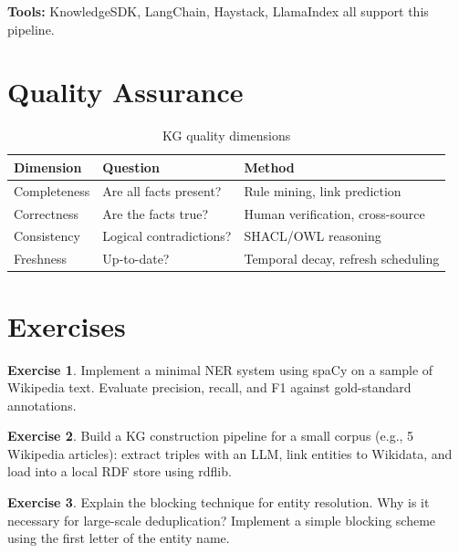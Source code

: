 \documentclass[11pt,a4paper,oneside,openany]{book}
\theoremstyle{definition}
\newtheorem{exercise}{Exercise}[chapter]
\theoremstyle{plain}
\theoremstyle{remark}
\begin{document}
\textbf{Tools:} KnowledgeSDK, LangChain, Haystack, LlamaIndex all support this pipeline.

\section{Quality Assurance}\label{sec:qa}

\begin{table}[h]
	\centering
	\caption{KG quality dimensions}
	\label{tab:kg-quality}
	\begin{tabular}{lp{4cm}p{5.5cm}}
		\toprule
		Dimension    & Question                & Method                             \\
		\midrule
		Completeness & Are all facts present?  & Rule mining, link prediction       \\
		Correctness  & Are the facts true?     & Human verification, cross-source   \\
		Consistency  & Logical contradictions? & SHACL/OWL reasoning                \\
		Freshness    & Up-to-date?             & Temporal decay, refresh scheduling \\
		\bottomrule
	\end{tabular}
\end{table}

\section{Exercises}

\begin{exercise}
	Implement a minimal NER system using spaCy on a sample of Wikipedia text. Evaluate precision, recall, and F1 against gold-standard annotations.
\end{exercise}

\begin{exercise}
	Build a KG construction pipeline for a small corpus (e.g., 5 Wikipedia articles): extract triples with an LLM, link entities to Wikidata, and load into a local RDF store using rdflib.
\end{exercise}

\begin{exercise}
	Explain the blocking technique for entity resolution. Why is it necessary for large-scale deduplication? Implement a simple blocking scheme using the first letter of the entity name.
\end{exercise}
\end{document}
